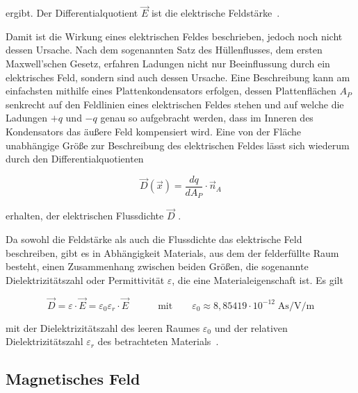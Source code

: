 ergibt. Der Differentialquotient $\vec E$ ist die elektrische Feldstärke~\cite{EM_Schirmung}. \par
\vspace{\linespace}
Damit ist die Wirkung eines elektrischen Feldes beschrieben, jedoch noch nicht dessen Ursache. Nach dem sogenannten Satz des Hüllenflusses, dem ersten Maxwell'schen Gesetz, erfahren Ladungen nicht nur Beeinflussung durch ein elektrisches Feld, sondern sind auch dessen Ursache. Eine Beschreibung kann am einfachsten mithilfe eines Plattenkondensators erfolgen, dessen Plattenflächen $A_P$ senkrecht auf den Feldlinien eines elektrischen Feldes stehen und auf welche die Ladungen $+q$ und $-q$ genau so aufgebracht werden, dass im Inneren des Kondensators das äußere Feld kompensiert wird. Eine von der Fläche unabhängige Größe zur Beschreibung des elektrischen Feldes lässt sich wiederum durch den Differentialquotienten 

\begin{equation}
    \vec D(\vec x) = \frac{dq}{dA_P} \cdot \vec n_A
\end{equation}

erhalten, der elektrischen Flussdichte $\vec D$ \cite{EM_Schirmung}. \par
\vspace{\linespace}

Da sowohl die Feldstärke als auch die Flussdichte das elektrische Feld beschreiben, gibt es in Abhängigkeit Materials, aus dem der felderfüllte Raum besteht, einen Zusammenhang zwischen beiden Größen, die sogenannte Dielektrizitätszahl oder Permittivität $\varepsilon$, die eine Materialeigenschaft ist. Es gilt

\begin{equation}
    \vec D = \varepsilon \cdot \vec E = \varepsilon_0 \varepsilon_r \cdot \vec E \qquad \quad \text{mit} \qquad \varepsilon_0 \approx 8,85419 \cdot 10^{-12} \; \si{\ampere\second\per\volt\per\meter}
    \label{eq:2_Materialgleichung_elektrisches_Feld}
\end{equation}

mit der Dielektrizitätszahl des leeren Raumes $\varepsilon_0$ und der relativen Dielektrizitätszahl $\varepsilon_r$ des betrachteten Materials~\cite{EM_Schirmung}.


\subsection{Magnetisches Feld}\label{cha:2_sub_Magnetisches_Feld}

